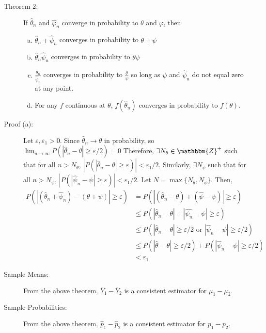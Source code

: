 \documentclass[10pt]{extarticle}
\newcommand{\Z}{\mathbbm{Z}}
\begin{document}
  \begin{description}
    \item[Theorem 2:] If $\hat{\theta}_n$ and $\hat{\varphi}_n$ converge in probability to $\theta$ and $\varphi$, then 
      \begin{enumerate}[(a)]
        \item $\hat{\theta}_n + \hat{\psi}_n$ converges in probability to $\theta + \psi$
        \item $\hat{\theta}_n\hat{\psi}_n$ converges in probability to $\theta\psi$
        \item $\frac{\hat{\theta}_n}{\hat{\psi}_n}$ converges in probability to $\frac{\theta}{\psi}$ so long as $\psi$ and $\hat{\psi}_n$ do not equal zero at any point.
        \item For any $f$ continuous at $\theta$, $f(\hat{\theta}_n)$ converges in probability to $f(\theta)$.
      \end{enumerate}
    \item[Proof (a):] Let $\varepsilon,\varepsilon_1 > 0$. Since $\hat{\theta}_n \rightarrow \theta$ in probability, so $\lim_{n\rightarrow \infty} P(|\hat{\theta}_n - \theta|\geq \varepsilon/2) = 0$ Therefore, $\exists N_{\theta}\in \Z^{+}$ such that for all $n > N_{\theta}$, $|P(|\hat{\theta}_n - \theta| \geq \varepsilon)|<\varepsilon_1/2$. Similarly, $\exists N_{\psi}$ such that for all $n > N_{\psi}$, $|P(|\hat{\psi}_n - \psi| \geq \varepsilon)|<\varepsilon_1/2$. Let $N = \max\{N_{\theta},N_{\psi}\}$. Then,
      \begin{align*}
        P(|\left(\hat{\theta}_n + \hat{\psi}_n\right) - (\theta + \psi)| \geq \varepsilon) &= P(|(\hat{\theta}_n -\theta) + (\hat{\psi} - \psi)| \geq \varepsilon)\\
                           &\leq P(|\hat{\theta}_n - \theta| + |\hat{\psi_n}- \psi| \geq \varepsilon)\\
                           &\leq P(|\hat{\theta}_n-\theta| \geq \varepsilon/2 \text{ or }|\hat{\psi}_n - \psi| \geq \varepsilon/2)\\
                           &\leq P(|\hat{\theta} - \theta| \geq \varepsilon/2) + P(|\hat{\psi}_n - \psi| \geq \varepsilon/2)\\
                           &< \varepsilon_1
      \end{align*}
  \end{description}
  \begin{description}
    \item[Sample Means:] From the above theorem, $\overline{Y}_1 - \overline{Y}_2$ is a consistent estimator for $\mu_1 - \mu_2$.
    \item[Sample Probabilities:] From the above theorem, $\hat{p}_1 - \hat{p}_2$ is a consistent estimator for $p_1-p_2$.
  \end{description}
\end{document}

